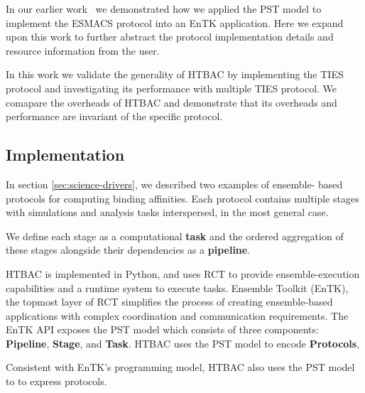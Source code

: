 
	In our earlier work~\cite{dakka2017} we demonstrated how we applied the
PST model to implement the ESMACS protocol into an EnTK application. Here we
expand upon this work to further abstract the protocol implementation details
and resource information from the user. 

In this work we validate the generality of HTBAC by implementing the TIES
protocol and investigating its performance with multiple TIES protocol. We
comapare the overheads of HTBAC and demonstrate that its overheads and
performance are invariant of the specific protocol.

\subsection{Implementation}

In section \ref{sec:science-drivers}, we described two examples of ensemble-
based protocols for computing binding affinities. Each protocol contains
multiple stages with simulations and analysis tasks interspersed, in the most
general case.



We define each stage as a computational \textbf{task} and the ordered
aggregation of these stages alongside their dependencies as a
\textbf{pipeline}.

HTBAC is implemented in Python, and uses RCT to provide ensemble-execution
capabilities and a runtime system to execute tasks. Ensemble Toolkit (EnTK),
the topmost layer of RCT simplifies the process of creating ensemble-based
applications with complex coordination and communication requirements. The
EnTK API exposes the PST model which consists of three components:
\textbf{Pipeline}, \textbf{Stage}, and \textbf{Task}. HTBAC uses the PST model
to encode \textbf{Protocols},

Consistent with EnTK's programming model, HTBAC also uses the PST model to to
express  protocols.

